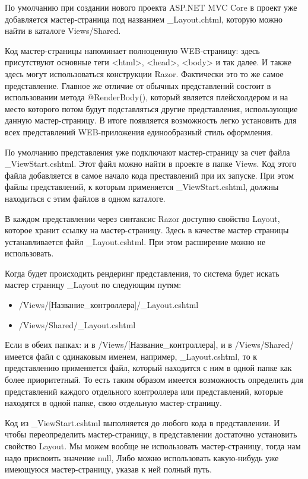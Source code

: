 \documentclass[a4paper,14pt]{extreport}
\begin{document}
По умолчанию при создании нового проекта ASP.NET MVC Core в проект уже добавляется мастер-страница под названием \_Layout.chtml, которую можно найти в каталоге Views/Shared.

Код мастер-страницы напоминает полноценную WEB-страницу: здесь присутствуют основные теги <html>, <head>, <body> и так далее. И также здесь могут использоваться конструкции Razor. Фактически это то же самое представление. Главное же отличие от обычных представлений состоит в использовании метода @RenderBody(), который является плейсхолдером и на место которого потом будут подставляться другие представления, использующие данную мастер-страницу. В итоге появляется возможность легко установить для всех представлений WEB-приложения единообразный стиль оформления.

По умолчанию представления уже подключают мастер-страницу за счет файла \_ViewStart.cshtml. Этот файл можно найти в проекте в папке Views. Код этого файла добавляется в самое начало кода преставлений при их запуске. При этом файлы представлений, к которым применяется \_ViewStart.cshtml, должны находиться с этим файлов в одном каталоге.

В каждом представлении через синтаксис Razor доступно свойство Layout, которое хранит ссылку на мастер-страницу. Здесь в качестве мастер страницы устанавливается файл \_Layout.cshtml. При этом расширение можно не использовать.

Когда будет происходить рендеринг представления, то система будет искать мастер страницу \_Layout по следующим путям:

\begin{itemize}
	\item /Views/[Название\_контроллера]/\_Layout.cshtml
	\item /Views/Shared/\_Layout.cshtml
\end{itemize}

Если в обеих папках: и в /Views/[Название\_контроллера], и в /Views/Shared/ имеется файл с одинаковым именем, например, \_Layout.cshtml, то к представлению применяется файл, который находится с ним в одной папке как более приоритетный. То есть таким образом имеется возможность определить для представлений каждого отдельного контроллера или представлений, которые находятся в одной папке, свою отдельную мастер-страницу.

Код из \_ViewStart.cshtml выполняется до любого кода в представлении. И чтобы переопределить мастер-страницу, в представлении достаточно установить свойство Layout. Мы можем вообще не использовать мастер-страницу, тогда нам надо присвоить значение null, Либо можно использовать какую-нибудь уже имеющуюся мастер-страницу, указав к ней полный путь.
\end{document}
